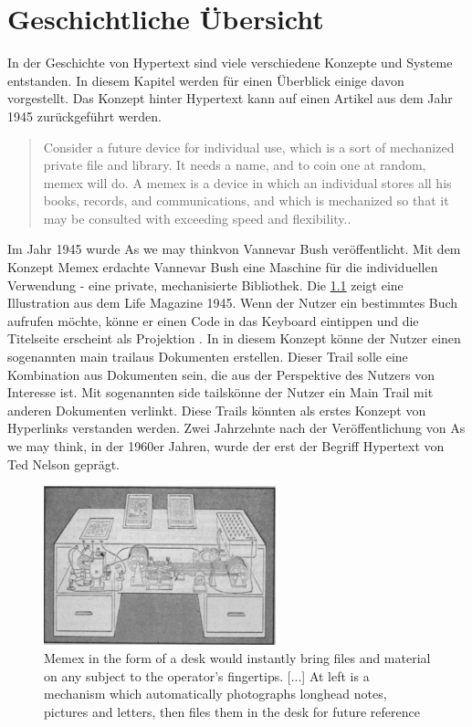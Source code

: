 \chapter{Geschichtliche Übersicht}
\label{ch:Geschichtlich}

In der Geschichte von Hypertext sind viele verschiedene Konzepte und Systeme entstanden. In diesem Kapitel werden für einen Überblick einige davon vorgestellt. Das Konzept hinter Hypertext kann auf einen Artikel aus dem Jahr 1945 zurückgeführt werden.

\begin{quote}
	\glqq Consider a future device for individual use, which is a sort of mechanized private file and library. It needs a name, and to coin one at random, memex will do. A memex is a device in which an individual stores all his books, records, and communications, and which is mechanized so that it may be consulted with exceeding speed and flexibility.\grqq{ }\cite[Section 6]{Bush1945}.
\end{quote}

Im Jahr 1945 wurde \glqq As we may think\grqq{ }von Vannevar Bush veröffentlicht. Mit dem Konzept \glqq Memex\grqq{ } erdachte Vannevar Bush eine Maschine für die individuellen Verwendung - eine private, mechanisierte Bibliothek. Die \ref{fig:memex} zeigt eine Illustration aus dem Life Magazine 1945. Wenn der Nutzer ein bestimmtes Buch aufrufen möchte, könne er einen Code in das Keyboard eintippen und die Titelseite erscheint als Projektion \cite[S.121]{Life1945} \cite[Section 6]{Bush1945}. In in diesem Konzept könne der Nutzer einen sogenannten \glqq main trail\grqq{ }aus Dokumenten erstellen. Dieser Trail solle eine Kombination aus Dokumenten sein, die aus der Perspektive des Nutzers von Interesse ist. Mit sogenannten \glqq side tails\grqq{ }könne der Nutzer ein Main Trail mit anderen Dokumenten \glqq verlinkt\grqq{ }\cite[Section 7]{Bush1945}. Diese Trails könnten als erstes Konzept von Hyperlinks verstanden werden. Zwei Jahrzehnte nach der Veröffentlichung von \glqq As we may think\grqq{ }, in der 1960er Jahren, wurde der erst der Begriff Hypertext von Ted Nelson geprägt. 

\begin{figure}[!ht]
	\centering
	\includegraphics[width=0.6\textwidth]{image/memex}
	\caption{\glqq Memex in the form of a desk would instantly bring files and material on any subject to the operator's fingertips. [...] At left is a mechanism which automatically photographs longhead notes, pictures and letters, then files them in the desk for future reference\grqq{ } \cite[S.123]{Life1945}}
	\label{fig:memex}
\end{figure}


